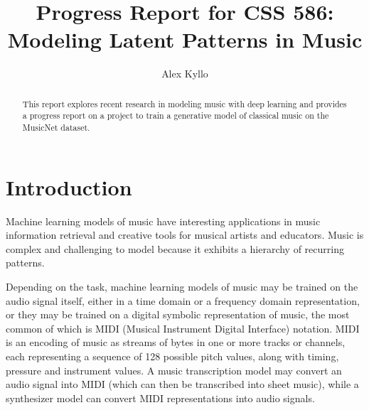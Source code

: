 \documentclass[sigconf,authorversion]{acmart}
\begin{document}
\renewcommand\footnotetextcopyrightpermission[1]{}
\pagestyle{plain}
\title{Progress Report for CSS 586: \\
Modeling Latent Patterns in Music}


\author{Alex Kyllo}

\begin{abstract}
This report explores recent research in modeling music with deep learning and
provides a progress report on a project to train a generative model of classical
music on the MusicNet dataset.
\end{abstract}


\maketitle

\section{Introduction}

Machine learning models of music have interesting applications in music
information retrieval and creative tools for musical artists and educators.
Music is complex and challenging to model because it exhibits a hierarchy of
recurring patterns. 

Depending on the task, machine learning models of music may be trained on the
audio signal itself, either in a time domain or a frequency domain
representation, or they may be trained on a digital symbolic representation of
music, the most common of which is MIDI (Musical Instrument Digital Interface)
notation. MIDI is an encoding of music as streams of bytes in one or more tracks
or channels, each representing a sequence of 128 possible pitch values, along
with timing, pressure and instrument values. A music transcription model may
convert an audio signal into MIDI (which can then be transcribed into sheet
music), while a synthesizer model can convert MIDI representations into audio
signals.
\end{document}

